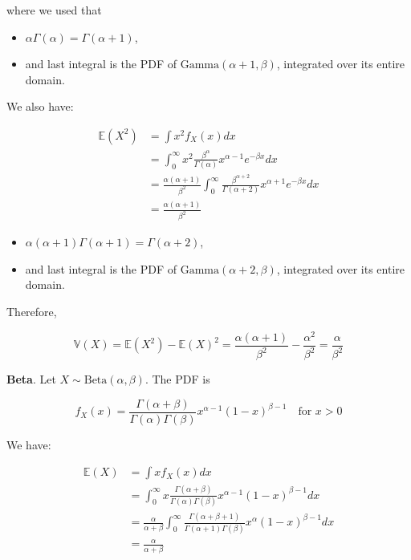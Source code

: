 where we used that

\begin{itemize}[tightlist]
\item
  \(\alpha \Gamma(\alpha) = \Gamma(\alpha + 1)\),
\item
  and last integral is the PDF of \(\text{Gamma}(\alpha + 1, \beta)\),
  integrated over its entire domain.
\end{itemize}

We also have:

\begin{align}
\mathbb{E}(X^2) 
&= \int x^2 f_X(x) dx \\
&= \int_0^\infty x^2 \frac{\beta^\alpha}{\Gamma(\alpha)} x^{\alpha - 1} e^{-\beta x} dx \\
&= \frac{\alpha (\alpha + 1)}{\beta^2} \int_0^\infty\frac{\beta^{\alpha + 2}}{\Gamma(\alpha + 2)} x^{\alpha + 1} e^{-\beta x} dx \\
&= \frac{\alpha (\alpha + 1)}{\beta^2}
\end{align}

\begin{itemize}[tightlist]
\item
  \(\alpha (\alpha + 1) \Gamma(\alpha + 1) = \Gamma(\alpha + 2)\),
\item
  and last integral is the PDF of \(\text{Gamma}(\alpha + 2, \beta)\),
  integrated over its entire domain.
\end{itemize}

Therefore,

\[ \mathbb{V}(X) = \mathbb{E}(X^2) - \mathbb{E}(X)^2 = \frac{\alpha (\alpha + 1)}{\beta^2} - \frac{\alpha^2}{\beta^2} = \frac{\alpha}{\beta^2} \]

\textbf{Beta}. Let \(X \sim \text{Beta}(\alpha, \beta)\). The PDF is

\[f_X(x) = \frac{\Gamma(\alpha + \beta)}{\Gamma(\alpha) \Gamma(\beta)} x^{\alpha - 1}(1 - x)^{\beta - 1} \quad \text{for } x > 0\]

We have:

\begin{align}
\mathbb{E}(X) 
&= \int x f_X(x) dx \\
&= \int_0^\infty x \frac{\Gamma(\alpha + \beta)}{\Gamma(\alpha) \Gamma(\beta)} x^{\alpha - 1}(1 - x)^{\beta - 1} dx \\
&= \frac{\alpha}{\alpha + \beta} \int_0^\infty \frac{\Gamma(\alpha + \beta + 1)}{\Gamma(\alpha + 1) \Gamma(\beta)} x^{\alpha}(1 - x)^{\beta - 1} dx \\
&= \frac{\alpha}{\alpha + \beta}
\end{align}

